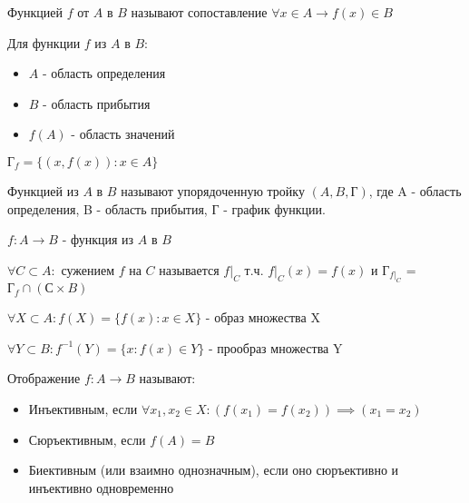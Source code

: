 \documentclass[calculus]{subfiles}
\begin{document}
    \begin{n_definition}[Функция]
        Функцией $f$ от $A$ в $B$ называют сопоставление $\forall x \in A \to f(x) \in B$
    \end{n_definition}

    \begin{notation}
        Для функции $f$ из $A$ в $B$:
        \begin{itemize}
            \item $A$ - область определения
            \item $B$ - область прибытия
            \item $f(A)$ - область значений
        \end{itemize}
    \end{notation}

    \begin{definition}
        $Г_f = \{(x, f(x)) : x \in A\}$
    \end{definition}

    \begin{definition}[Функция]
        Функцией из $A$ в $B$ называют упорядоченную тройку $(A, B, Г)$, где A - область определения, B - область прибытия, Г - график функции.
    \end{definition}

    \begin{notation}[Функция]
        $f: A \to B$ - функция из $A$ в $B$
    \end{notation}

    \begin{notation}
        $\forall C \subset A:$ сужением $f$ на $C$ называется $f|_C$ т.ч.  $f|_C(x) = f(x)$  и $Г_{f|_C}$ = $Г_f \cap (С \times B) $
    \end{notation}

    \begin{notation}
        $\forall X \subset A: f(X) = \{f(x) : x \in X\}$ - образ множества X
    \end{notation}

    \begin{notation}
        $\forall Y \subset B: f^{-1}(Y) = \{x : f(x) \in Y\}$ - прообраз множества Y
    \end{notation}

    Отображение $f: A \to B$ называют:
    \begin{itemize}
        \item Инъективным, если $\forall x_1, x_2 \in X: (f(x_1) = f(x_2)) \implies (x_1 = x_2)$
        \item Сюръективным, если $f(A) = B$
        \item Биективным (или взаимно однозначным), если оно сюръективно и инъективно одновременно
    \end{itemize}
\end{document}
